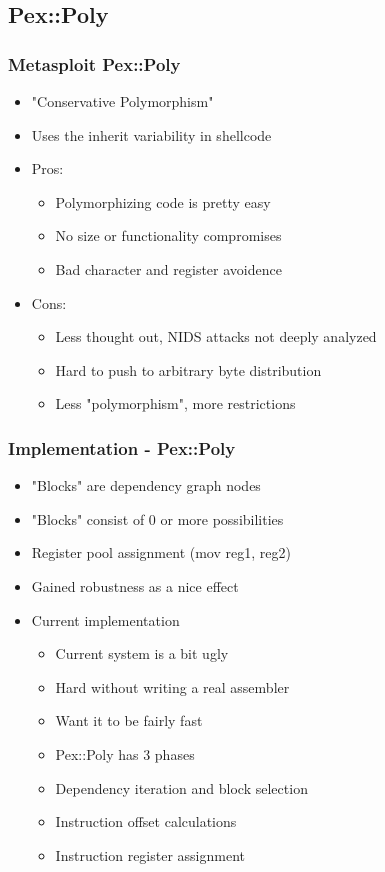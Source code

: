 \documentclass{beamer}
\newenvironment{sitemize}{\vspace{1mm}\begin{itemize}\itemsep 4pt\small}{\end{itemize}}
\begin{document}
\subsection{Pex::Poly}

\begin{frame}[t]
  \frametitle{Metasploit Pex::Poly}
  \begin{sitemize}
    \item "Conservative Polymorphism"
    \item Uses the inherit variability in shellcode
    \pause
    \item Pros:
    \begin{sitemize}
      \item Polymorphizing code is pretty easy
      \item No size or functionality compromises
      \item Bad character and register avoidence
    \end{sitemize}
    \pause
    \item Cons:
    \begin{sitemize}
      \item Less thought out, NIDS attacks not deeply analyzed
      \item Hard to push to arbitrary byte distribution
      \item Less "polymorphism", more restrictions
    \end{sitemize}
  \end{sitemize}
\end{frame}

\begin{frame}[t]
  \frametitle{Implementation - Pex::Poly}
  \begin{sitemize}
    \item "Blocks" are dependency graph nodes
    \item "Blocks" consist of 0 or more possibilities
    \item Register pool assignment (mov reg1, reg2)
    \item Gained robustness as a nice effect
    \pause
    \item Current implementation
    \begin{sitemize}
      \item Current system is a bit ugly
      \item Hard without writing a real assembler
      \item Want it to be fairly fast
      \pause
      \item Pex::Poly has 3 phases
      \item Dependency iteration and block selection
      \item Instruction offset calculations
      \item Instruction register assignment
    \end{sitemize}
  \end{sitemize}
\end{frame}
\end{document}
